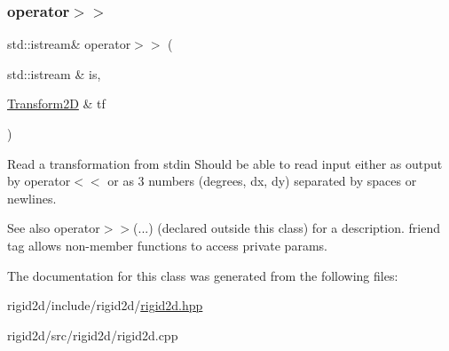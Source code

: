 \subsubsection{\texorpdfstring{operator$>$$>$}{operator>>}}
{\footnotesize\ttfamily std\+::istream\& operator$>$$>$ (\begin{DoxyParamCaption}\item[{std\+::istream \&}]{is,  }\item[{\hyperlink{classrigid2d_1_1Transform2D}{Transform2D} \&}]{tf }\end{DoxyParamCaption})\hspace{0.3cm}{\ttfamily [friend]}}



Read a transformation from stdin Should be able to read input either as output by operator$<$$<$ or as 3 numbers (degrees, dx, dy) separated by spaces or newlines. 

\begin{DoxySeeAlso}{See also}
operator$>$$>$(...) (declared outside this class) for a description. friend tag allows non-\/member functions to access private params. 
\end{DoxySeeAlso}


The documentation for this class was generated from the following files\+:\begin{DoxyCompactItemize}
\item 
rigid2d/include/rigid2d/\hyperlink{rigid2d_8hpp}{rigid2d.\+hpp}\item 
rigid2d/src/rigid2d/rigid2d.\+cpp\end{DoxyCompactItemize}
